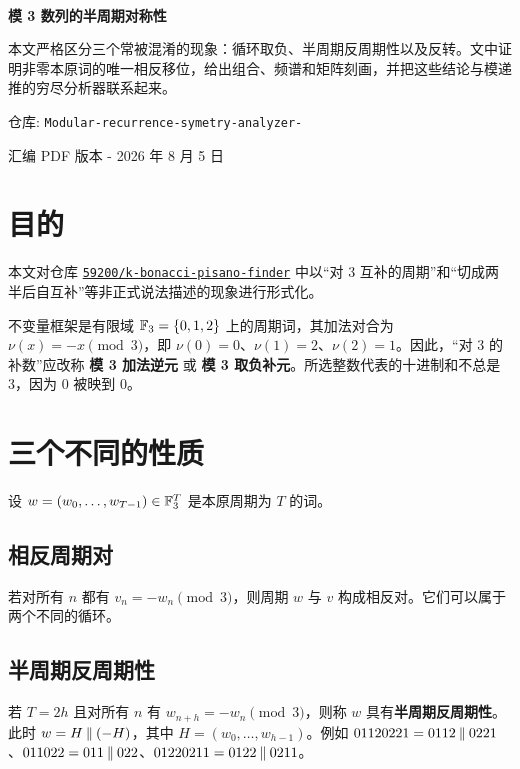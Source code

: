\documentclass[11pt,a4paper]{article}
\begin{document}
\begin{titlepage}\thispagestyle{empty}\vspace*{22mm}{\color{accent}\rule{\textwidth}{1.2pt}}\\[15mm]{\fontsize{27}{33}\selectfont\bfseries\color{ink}模 3 数列的半周期对称性\par}\vspace{13mm}\begin{summarybox}本文严格区分三个常被混淆的现象：循环取负、半周期反周期性以及反转。文中证明非零本原词的唯一相反移位，给出组合、频谱和矩阵刻画，并把这些结论与模递推的穷尽分析器联系起来。\end{summarybox}\vfill{\large\color{muted}仓库: \texttt{Modular-recurrence-symetry-analyzer-}\par}{\large\color{muted}汇编 PDF 版本 - 2026 年 8 月 5 日\par}\vspace{12mm}{\color{accent}\rule{\textwidth}{1.2pt}}\end{titlepage}
\renewcommand{\contentsname}{目录}\tableofcontents\clearpage
\section{目的}
本文对仓库 \href{https://github.com/59200/k-bonacci-pisano-finder}{\texttt{59200/k-bonacci-pisano-finder}} 中以“对 3 互补的周期”和“切成两半后自互补”等非正式说法描述的现象进行形式化。

不变量框架是有限域 \(\mathbb F_3=\{0,1,2\}\) 上的周期词，其加法对合为 \(\nu(x)=-x\pmod3\)，即 \(\nu(0)=0\)、\(\nu(1)=2\)、\(\nu(2)=1\)。因此，“对 3 的补数”应改称 \textbf{模 3 加法逆元} 或 \textbf{模 3 取负补元}。所选整数代表的十进制和不总是 3，因为 0 被映到 0。
\section{三个不同的性质}
设 \(w=(w_0,\ldots,w_{T-1})\in\mathbb F_3^T\) 是本原周期为 \(T\) 的词。
\subsection{相反周期对}
若对所有 \(n\) 都有 \(v_n=-w_n\pmod3\)，则周期 \(w\) 与 \(v\) 构成相反对。它们可以属于两个不同的循环。
\subsection{半周期反周期性}
若 \(T=2h\) 且对所有 \(n\) 有 \(w_{n+h}=-w_n\pmod3\)，则称 \(w\) 具有\textbf{半周期反周期性}。此时 \(w=H\mathbin{\Vert}(-H)\)，其中 \(H=(w_0,\ldots,w_{h-1})\)。例如 \(01120221=0112\mathbin{\Vert}0221\)、\(011022=011\mathbin{\Vert}022\)、\(01220211=0122\mathbin{\Vert}0211\)。
\end{document}
